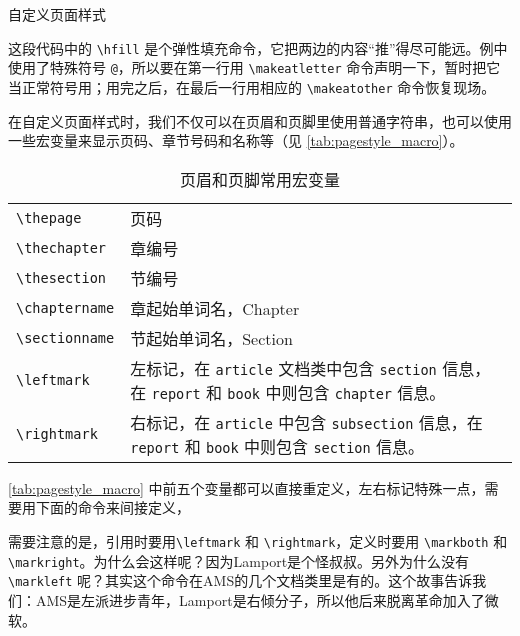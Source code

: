 \begin{example}[h]
\caption{自定义页面样式}
\label{exa:def_pagestyle}
\end{example}

这段代码中的 \verb|\hfill| 是个弹性填充命令，它把两边的内容“推”得尽可能远。例中使用了特殊符号 \texttt{@}，所以要在第一行用 \verb|\makeatletter| 命令声明一下，暂时把它当正常符号用；用完之后，在最后一行用相应的 \verb|\makeatother| 命令恢复现场。

在自定义页面样式时，我们不仅可以在页眉和页脚里使用普通字符串，也可以使用一些宏变量来显示页码、章节号码和名称等（见 \autoref{tab:pagestyle_macro}）。

\begin{table}[!htbp]
\centering
\caption{页眉和页脚常用宏变量}
\label{tab:pagestyle_macro}
\begin{tabularx}{350pt}{lX}
    \toprule
    \verb|\thepage| & 页码 \\
    \verb|\thechapter| & 章编号 \\
    \verb|\thesection| & 节编号 \\
    \verb|\chaptername| & 章起始单词名，Chapter \\
    \verb|\sectionname| & 节起始单词名，Section \\
    \verb|\leftmark| & 左标记，在 \texttt{article} 文档类中包含 \texttt{section} 信息，在 \texttt{report} 和 \texttt{book} 中则包含 \texttt{chapter} 信息。\\
    \verb|\rightmark| & 右标记，在 \texttt{article} 中包含 \texttt{subsection} 信息，在 \texttt{report} 和 \texttt{book} 中则包含 \texttt{section} 信息。\\
    \bottomrule
\end{tabularx}
\end{table}

\autoref{tab:pagestyle_macro} 中前五个变量都可以直接重定义，左右标记特殊一点，需要用下面的命令来间接定义，

\begin{Code}[numbers=none]
\end{Code}

需要注意的是，引用时要用\verb|\leftmark| 和 \verb|\rightmark|，定义时要用 \verb|\markboth| 和 \verb|\markright|。为什么会这样呢？因为Lamport是个怪叔叔。另外为什么没有 \verb|\markleft| 呢？其实这个命令在AMS的几个文档类里是有的。这个故事告诉我们：AMS是左派进步青年，Lamport是右倾分子，所以他后来脱离革命加入了微软。

